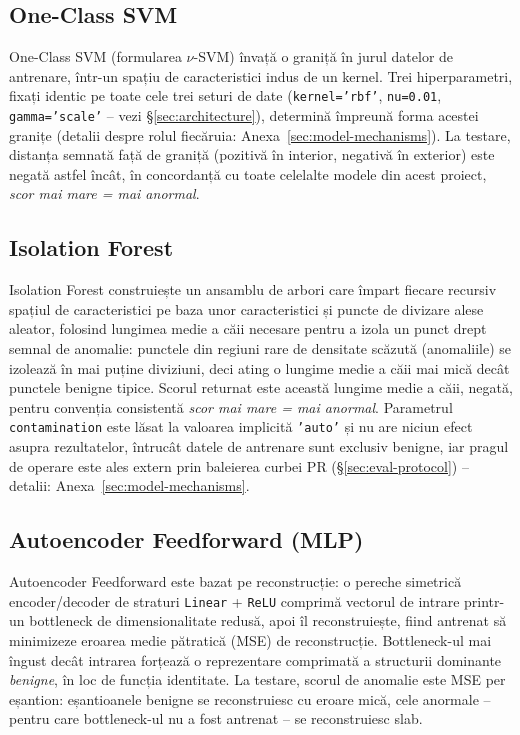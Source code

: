 \subsection{One-Class SVM}

One-Class SVM (formularea $\nu$-SVM) învață o graniță în jurul datelor de antrenare, într-un spațiu de caracteristici indus de un kernel. Trei hiperparametri, fixați identic pe toate cele trei seturi de date (\texttt{kernel='rbf'}, \texttt{nu=0.01}, \texttt{gamma='scale'} -- vezi \S\ref{sec:architecture}), determină împreună forma acestei granițe (detalii despre rolul fiecăruia: Anexa~\ref{sec:model-mechanisms}). La testare, distanța semnată față de graniță (pozitivă în interior, negativă în exterior) este negată astfel încât, în concordanță cu toate celelalte modele din acest proiect, \emph{scor mai mare = mai anormal}.

\subsection{Isolation Forest}

Isolation Forest construiește un ansamblu de arbori care împart fiecare recursiv spațiul de caracteristici pe baza unor caracteristici și puncte de divizare alese aleator, folosind lungimea medie a căii necesare pentru a izola un punct drept semnal de anomalie: punctele din regiuni rare de densitate scăzută (anomaliile) se izolează în mai puține diviziuni, deci ating o lungime medie a căii mai mică decât punctele benigne tipice. Scorul returnat este această lungime medie a căii, negată, pentru convenția consistentă \emph{scor mai mare = mai anormal}. Parametrul \texttt{contamination} este lăsat la valoarea implicită \texttt{'auto'} și nu are niciun efect asupra rezultatelor, întrucât datele de antrenare sunt exclusiv benigne, iar pragul de operare este ales extern prin baleierea curbei PR (\S\ref{sec:eval-protocol}) -- detalii: Anexa~\ref{sec:model-mechanisms}.

\subsection{Autoencoder Feedforward (MLP)}

Autoencoder Feedforward este bazat pe reconstrucție: o pereche simetrică encoder/decoder de straturi \texttt{Linear} + \texttt{ReLU} comprimă vectorul de intrare printr-un bottleneck de dimensionalitate redusă, apoi îl reconstruiește, fiind antrenat să minimizeze eroarea medie pătratică (MSE) de reconstrucție. Bottleneck-ul mai îngust decât intrarea forțează o reprezentare comprimată a structurii dominante \emph{benigne}, în loc de funcția identitate. La testare, scorul de anomalie este MSE per eșantion: eșantioanele benigne se reconstruiesc cu eroare mică, cele anormale -- pentru care bottleneck-ul nu a fost antrenat -- se reconstruiesc slab.


